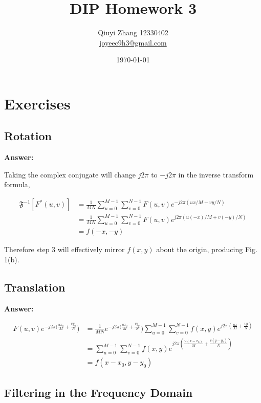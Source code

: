 \documentclass{article}
\begin{document}
\title{DIP Homework 3}
\author{Qiuyi Zhang 12330402 \\ \href{mailto:joyeec9h3@gmail.com}{joyeec9h3@gmail.com}} 
\date{\today}
\maketitle
\tableofcontents
\section{Exercises}

\subsection{Rotation}

\textbf{Answer:} 

Taking the complex conjugate will change $j2\pi$ to $-j2\pi$ in the inverse transform formula,

\begin{align*} 
\mathfrak{F}^{-1}[F^*(u, v)] & = \frac{1}{MN} \sum_{u=0}^{M-1}\sum_{v=0}^{N-1} F(u, v) e^{-j2\pi (ux/M + vy/N)} \\
 & = \frac{1}{MN} \sum_{u=0}^{M-1}\sum_{v=0}^{N-1} F(u, v) e^{j2\pi (u(-x)/M + v(-y)/N)} \\
 & = f(-x, -y)
\end{align*}

Therefore step 3 will effectively mirror $f (x,y)$ about the origin, producing Fig. 1(b).

\subsection{Translation}

\textbf{Answer:}

\begin{align*} 
F(u, v)e^{-j2\pi (\frac{ux_0}{M} +\frac{vy_0}{N}}) &
=
\frac{1}{MN} e^{-j2\pi (\frac{ux_0}{M} +\frac{vy_0}{N}}) \sum_{u=0}^{M-1}\sum_{v=0}^{N-1} f(x, y) e^{j2\pi (\frac{ux}{M} +\frac{vy}{N})} \\
 & = \sum_{u=0}^{M-1} \sum_{v=0}^{N-1} f(x, y) e^{j2\pi (\frac{u(x - x_0)}{M} +\frac{v(y - y_0)}{N})} \\
 & = f(x - x_0, y - y_0)
\end{align*}

\subsection{Filtering in the Frequency Domain}
\end{document}
